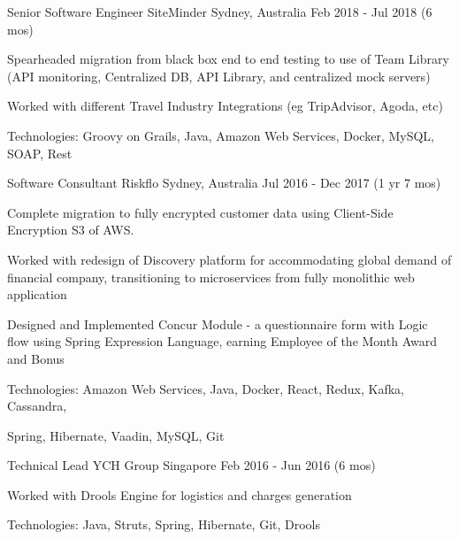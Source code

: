\begin{cventries}
  \cventry
  {Senior Software Engineer} %
  {SiteMinder} %
  {Sydney, Australia} %
  {Feb 2018 - Jul 2018 (6 mos)} %
  {
    \begin{cvitems} %
      \item {Spearheaded migration from black box end to end testing to use of Team Library (API monitoring, Centralized DB, API Library, and centralized mock servers)}
      \item {Worked with different Travel Industry Integrations (eg TripAdvisor, Agoda, etc)}
      \item {Technologies: Groovy on Grails, Java, Amazon Web Services, Docker, MySQL, SOAP, Rest}
    \end{cvitems}
  }

  \cventry
  {Software Consultant} %
  {Riskflo} %
  {Sydney, Australia} %
  {Jul 2016 - Dec 2017 (1 yr 7 mos)} %
  {
    \begin{cvitems} %
      \item {Complete migration to fully encrypted customer data using Client-Side Encryption S3 of AWS.}
      \item {Worked with redesign of Discovery platform for accommodating global demand of financial company, transitioning to microservices from fully monolithic web application}
      \item {Designed and Implemented Concur Module - a questionnaire form with Logic flow using Spring Expression Language, earning Employee of the Month Award and Bonus}
      \item {Technologies: Amazon Web Services, Java, Docker, React, Redux, Kafka, Cassandra,}
      \item {Spring, Hibernate, Vaadin, MySQL, Git}
    \end{cvitems}
  }

  \cventry
  {Technical Lead} %
  {YCH Group} %
  {Singapore} %
  {Feb 2016 - Jun 2016 (6 mos)} %
  {
    \begin{cvitems} %
      \item {Worked with Drools Engine for logistics and charges generation}
      \item {Technologies: Java, Struts, Spring, Hibernate, Git, Drools}
    \end{cvitems}
  }


\end{cventries}
